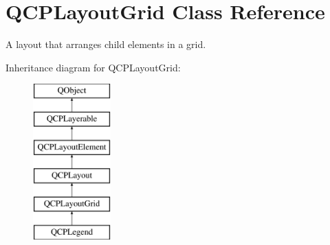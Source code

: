 \hypertarget{class_q_c_p_layout_grid}{}\section{Q\+C\+P\+Layout\+Grid Class Reference}
\label{class_q_c_p_layout_grid}


A layout that arranges child elements in a grid.  


Inheritance diagram for Q\+C\+P\+Layout\+Grid\+:\begin{figure}[H]
\begin{center}
\leavevmode
\includegraphics[height=6.000000cm]{class_q_c_p_layout_grid}
\end{center}
\end{figure}
